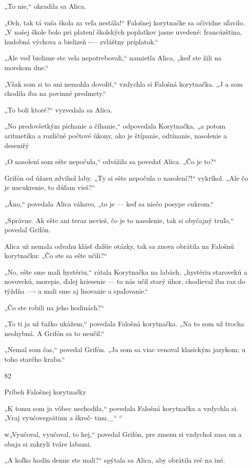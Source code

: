 \documentclass[12pt]{article}
\begin{document}
\begin{Parallel}[p]{}{}
{{„To nie,“ ohradila sa Alica.

„Och, tak tá vaša škola za veľa nestála!“ Falošnej
korytnačke sa očividne uľavilo. „V našej škole bolo pri
platení školských poplatkov jasne uvedené: francúzština,
hudobná výchova a bielizeň -— zvláštny príplatok.“

„Ale veď bielizne ste vela nepotrebovali,“ namietla Alica,
„keď ste žili na morskom dne.“

„Však som si to ani nemohla dovoliť,“ vzdychla si Falošná
korytnačka. „J a som chodila iba na povinné predmety.“

„To boli ktoré?“ vyzvedala sa Alica.

„No predovšetkým pichanie a číhanie,“ odpovedala
Korytnačka, „a potom aritmetika a rozličné počtové úkony,
ako je štípanie, odtínanie, nasolenie a deseniřý

„O nasolení som ešte nepočula,“ odvážila sa povedať
Alica. „Čo je to?“

Grifón od úžasu zdvihol laby. „Ty si ešte nepočula
o nasolení?!“ vykríkol. „Ale čo je nacukrenie, to dúfam
vieš?“

„Áno,“ povedala Alica váhavo, „to je — keď sa niečo
posype cukrom.“

„Správne. Ak ešte ani teraz nevieš, čo je to nasolenie,
tak si obyčajný truľo,“ povedal Grifón.

Alica už nemala odvahu klásť ďalšie otázky, tak sa znova
obrátila na Falošnú korytnačku: „Čo ste sa ešte učili?“

„No, ešte sme mali hystériu,“ rátala Korytnačka na
labách, „hystériu starovekú a novovekú, morepis, ďalej
kriesenie — to nás učil starý úhor, chodieval iba raz do
týždňa —- a mali sme aj lisovanie a spaľovanie.“

„Čo ste robili na jeho hodinách?“

„To ti ja už ťažko ukážem,“ povedala Falošná korytnačka.
„Na to som už trocha neohybná. A Grifón sa to neučil.“

„Nemal som čas,“ povedal Grifón. „Ja som sa viac
venoval klasickým jazykom; u toho starého kraba.“

82

Príbeh Falošnej korytnačky

„K tomu som ja vôbec nechodila,“ povedala Falošná
korytnačka a vzdychla si. „Vraj vyučovegsätinu a škreč-
tinu._“ “

w„Vyučoval, vyučoval, to hej,“ povedal Grifón, pre zmenu
si vzdychol zasa on a obaja si zakryli tváre labami.

„A koľko hodín denne ste mali?“ spýtala sa Alica, aby
obrátila reč na iné.

}}
\end{Parallel}
\end{document}
